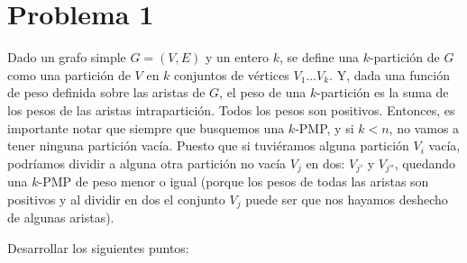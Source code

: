 \documentclass[11pt, a4paper, twoside]{article}
\begin{document}


\newpage

\section{Problema 1}
Dado un grafo simple $G = (V,E)$ y un entero $k$, se define una $k$-partición de $G$ como
una partición de $V$ en $k$ conjuntos de vértices $V_{1} \dots V_{k}$. Y, dada una función
de peso definida sobre las aristas de $G$, el peso de una $k$-partición es la suma de los pesos
de las aristas intrapartición. Todos los pesos son positivos. Entonces, es importante notar que
siempre que busquemos una $k$-PMP, y si $k < n$, no vamos a tener ninguna partición vacía. Puesto 
que si tuviéramos alguna partición $V_{i}$ vacía, podríamos dividir a alguna otra partición no
vacía $V_{j}$ en dos: $V_{j'}$ y $V_{j''}$, quedando una $k$-PMP de peso menor o igual (porque los pesos de
todas las aristas son positivos y al dividir en dos el conjunto $V_{j}$ puede ser que nos hayamos
deshecho de algunas aristas).

Desarrollar los siguientes puntos:
		
\end{document}
